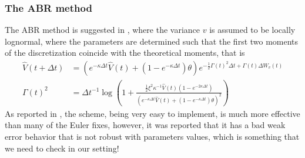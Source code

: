 \subsubsection{The ABR method}\label{sec:The ABR method}
The ABR method is suggested in \cite{andersen2005extended}, where the
variance $v$ is assumed to be locally lognormal, where the parameters are determined such that the first two moments of the discretization coincide with the theoretical moments, that is 
\begin{align}\label{eq: vol_moment_matching}
\hat{V}(t+\Delta t)&= \left(e^{-\kappa \Delta t}  \hat{V}(t) + \left( 1-e^{-\kappa \Delta t}\right) \theta  \right) e^{-\frac{1}{2} \Gamma(t)^2 \Delta t+\Gamma(t) \Delta W_v(t)}\nonumber\\
\Gamma(t)^2 &=\Delta t^{-1} \log \left(  1+ \frac{\frac{1}{2}\xi^2 \kappa^{-1} \hat{V}(t) (1-e^{-2 \kappa \Delta t})}{\left( e^{-\kappa \Delta t} \hat{V}(t) +(1-e^{- \kappa \Delta t}) \theta \right)^2 }\right)
\end{align}
As reported in \cite{lord2010comparison}, the scheme, being very easy to implement, is much more effective than many of the Euler fixes, however, it was reported that it has a bad weak error behavior that is not robust with parameters values, which is something that we need to check in our setting!
